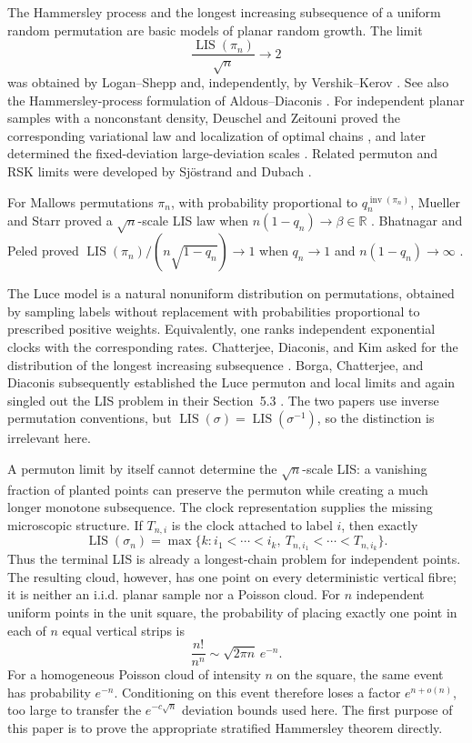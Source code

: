 \documentclass[11pt]{article}
\theoremstyle{remark}
\newcommand{\LIS}{\operatorname{LIS}}
\begin{document}
The Hammersley process and the longest increasing subsequence of a uniform
random permutation are basic models of planar random growth.  The limit
\[
        \frac{\LIS(\pi_n)}{\sqrt n}\longrightarrow 2
\]
was obtained by Logan--Shepp \cite{LoganShepp1977} and, independently,
by Vershik--Kerov \cite{VershikKerov1977}.  See also the
Hammersley-process formulation of Aldous--Diaconis
\cite{AldousDiaconis1995}.  For independent
planar samples with a nonconstant density, Deuschel and Zeitouni proved the
corresponding variational law and localization of optimal chains
\cite{DeuschelZeitouni1995}, and later determined the fixed-deviation
large-deviation scales \cite{DeuschelZeitouni1999}.  Related permuton and RSK
limits were developed by Sj\"ostrand \cite{Sjostrand2023} and Dubach
\cite{Dubach2023,Dubach2024}.

For Mallows permutations $\pi_n$, with probability proportional to
$q_n^{\operatorname{inv}(\pi_n)}$, Mueller and Starr proved a $\sqrt n$-scale
LIS law when $n(1-q_n)\to\beta\in\mathbb R$
\cite{MuellerStarr2013}.  Bhatnagar and Peled proved
$\LIS(\pi_n)/(n\sqrt{1-q_n})\to1$ when $q_n\to1$ and
$n(1-q_n)\to\infty$ \cite{BhatnagarPeled2015}.

The Luce model \cite{Luce1959} is a natural nonuniform distribution on
permutations, obtained by sampling labels without replacement with
probabilities proportional to prescribed positive weights.  Equivalently, one ranks independent exponential
clocks with the corresponding rates.  Chatterjee, Diaconis, and Kim asked for
the distribution of the longest increasing subsequence
\cite[Introduction]{ChatterjeeDiaconisKim2024}.  Borga, Chatterjee, and
Diaconis subsequently established the Luce permuton and local limits and
again singled out the LIS problem in their Section~5.3
\cite{BorgaChatterjeeDiaconis2026}.  The two papers use inverse permutation
conventions, but $\LIS(\sigma)=\LIS(\sigma^{-1})$, so the distinction is
irrelevant here.

A permuton limit by itself cannot determine the $\sqrt n$-scale LIS: a
vanishing fraction of planted points can preserve the permuton while creating
a much longer monotone subsequence.  The clock representation supplies the
missing microscopic structure.  If $T_{n,i}$ is the clock attached to label
$i$, then exactly
\[
 \LIS(\sigma_n)
 =\max\{k:i_1<\cdots<i_k,\ T_{n,i_1}<\cdots<T_{n,i_k}\}.
\]
Thus the terminal LIS is already a longest-chain problem for independent
points.  The resulting cloud, however, has one point on every deterministic
vertical fibre; it is neither an i.i.d. planar sample nor a Poisson cloud.
For $n$ independent uniform points in the unit square, the probability of
placing exactly one point in each of $n$ equal vertical strips is
\[
        \frac{n!}{n^n}\sim\sqrt{2\pi n}\,e^{-n}.
\]
For a homogeneous Poisson cloud of intensity $n$ on the square, the same
event has probability $e^{-n}$.  Conditioning on this event therefore loses
a factor $e^{n+o(n)}$, too large to transfer the $e^{-c\sqrt n}$ deviation
bounds used here.  The first purpose of this paper is to prove the
appropriate stratified Hammersley theorem directly.
\end{document}
